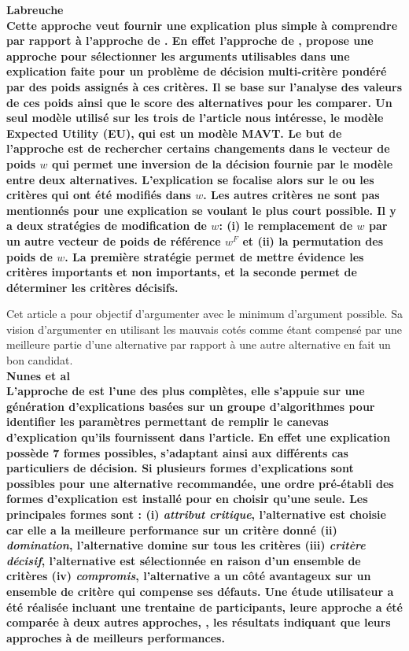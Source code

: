 \documentclass[a4paper, 11pt]{article}
\renewcommand{\textbf}[1]{\begingroup\bfseries\mathversion{bold}#1\endgroup}
\begin{document}
\noindent \textbf{Labreuche}\\ %

Cette approche veut fournir une explication plus simple à comprendre par rapport à l'approche de \textcolor{blue}{\citep{KLEIN1994201}}. En effet l'approche de \textcolor{blue}{\citep{LABREUCHE20111410}}, propose une approche pour sélectionner les arguments utilisables dans une explication faite pour un problème de décision multi-critère pondéré par des poids assignés à ces critères. Il se base sur l'analyse des valeurs de ces poids ainsi que le score des alternatives pour les comparer. Un seul modèle utilisé sur les trois de l'article nous intéresse, le modèle Expected Utility (EU), qui est un modèle MAVT. Le but de l'approche est de rechercher certains changements dans le vecteur de poids $w$ qui permet une inversion de la décision fournie par le modèle entre deux alternatives. L'explication se focalise alors sur le ou les critères qui ont été modifiés dans $w$. Les autres critères ne sont pas mentionnés pour une explication se voulant le plus court possible. Il y a deux stratégies de modification de $w$: (i) le remplacement de $w$ par un autre vecteur de poids de référence $w^F$ et (ii) la permutation des poids de $w$. La première stratégie permet de mettre évidence les critères importants et non importants, et la seconde permet de déterminer les critères décisifs.

Cet article a pour objectif d'argumenter avec le minimum d'argument possible. Sa vision d'argumenter en utilisant les mauvais cotés comme étant compensé par une meilleure partie d'une alternative par rapport à une autre alternative en fait un bon candidat.\\


\noindent \textbf{Nunes et al}\\ %

L'approche de \textcolor{blue}{\citep{NUNES2014669}} est l'une des plus complètes, elle s'appuie sur une génération d'explications basées sur un groupe d'algorithmes pour identifier les paramètres permettant de remplir le canevas d'explication qu'ils fournissent dans l'article. 
En effet une explication possède 7 formes possibles, s'adaptant ainsi aux différents cas particuliers de décision. Si plusieurs formes d'explications sont possibles pour une alternative recommandée, une ordre pré-établi des formes d'explication est installé pour en choisir qu'une seule. Les principales formes sont : (i) \textit{attribut critique}, l'alternative est choisie car elle a la meilleure performance sur un critère donné (ii) \textit{domination}, l'alternative domine sur tous les critères (iii) \textit{critère décisif}, l'alternative est sélectionnée en raison d'un ensemble de critères (iv) \textit{compromis}, l'alternative a un côté avantageux sur un ensemble de critère qui compense ses défauts.
Une étude utilisateur a été réalisée incluant une trentaine de participants, leure approche a été comparée à deux autres approches, \textcolor{blue}{\citep{KLEIN1994201,LABREUCHE20111410}}, les résultats indiquant que leurs approches à de meilleurs performances.
\end{document}
